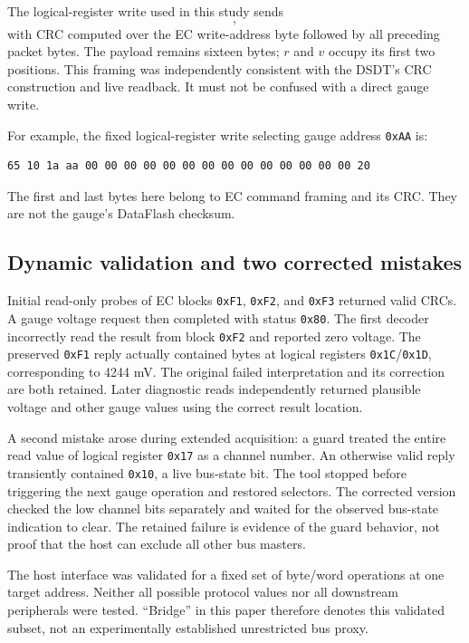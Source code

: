\documentclass[11pt,a4paper]{article}
\newcommand{\hex}[1]{\texttt{0x#1}}
\newcommand{\code}[1]{\texttt{\detokenize{#1}}}
\begin{document}
The logical-register write used in this study sends
\begin{equation}
 [\hex{65},\hex{10},r,v,\underbrace{0,\ldots,0}_{14},c],
\end{equation}
with CRC computed over the EC write-address byte followed by all preceding packet bytes. The payload remains sixteen bytes; $r$ and $v$ occupy its first two positions. This framing was independently consistent with the DSDT's CRC construction and live readback. It must not be confused with a direct gauge write.

For example, the fixed logical-register write selecting gauge address \hex{AA} is:
\begin{lstlisting}
65 10 1a aa 00 00 00 00 00 00 00 00 00 00 00 00 00 00 20
\end{lstlisting}
The first and last bytes here belong to EC command framing and its CRC. They are not the gauge's DataFlash checksum.

\subsection{Dynamic validation and two corrected mistakes}
Initial read-only probes of EC blocks \hex{F1}, \hex{F2}, and \hex{F3} returned valid CRCs. A gauge voltage request then completed with status \hex{80}. The first decoder incorrectly read the result from block \hex{F2} and reported zero voltage. The preserved \hex{F1} reply actually contained bytes \code{94 10} at logical registers \hex{1C}/\hex{1D}, corresponding to 4244 mV. The original failed interpretation and its correction are both retained. Later diagnostic reads independently returned plausible voltage and other gauge values using the correct result location.

A second mistake arose during extended acquisition: a guard treated the entire read value of logical register \hex{17} as a channel number. An otherwise valid reply transiently contained \hex{10}, a live bus-state bit. The tool stopped before triggering the next gauge operation and restored selectors. The corrected version checked the low channel bits separately and waited for the observed bus-state indication to clear. The retained failure is evidence of the guard behavior, not proof that the host can exclude all other bus masters.

The host interface was validated for a fixed set of byte/word operations at one target address. Neither all possible protocol values nor all downstream peripherals were tested. ``Bridge'' in this paper therefore denotes this validated subset, not an experimentally established unrestricted bus proxy.
\end{document}
